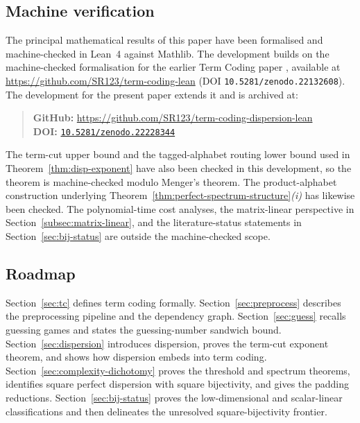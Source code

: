 \documentclass[11pt]{article}
\newcommand{\parencite}[1]{\citep{#1}}
\theoremstyle{definition}
\theoremstyle{plain}
\begin{document}
\subsection{Machine verification}
\label{subsec:verification}
The principal mathematical results of this paper have been formalised and machine-checked in Lean~4 against
Mathlib.  The development builds on the machine-checked formalisation for the earlier Term Coding paper
\parencite{riis2026termcoding}, available at
\url{https://github.com/SR123/term-coding-lean}
(DOI \texttt{10.5281/zenodo.22132608}).  The development for the present paper extends it and is archived at:
\begin{quote}
\noindent\textbf{GitHub:} \url{https://github.com/SR123/term-coding-dispersion-lean}\\
\textbf{DOI:} \href{https://doi.org/10.5281/zenodo.22228344}{\texttt{10.5281/zenodo.22228344}}
\end{quote}
The term-cut upper bound and the tagged-alphabet routing lower bound used in
Theorem~\ref{thm:disp-exponent} have also been checked in this development, so the theorem is machine-checked
modulo Menger's theorem.  The product-alphabet construction underlying
Theorem~\ref{thm:perfect-spectrum-structure}\textit{(i)} has likewise been checked.  The polynomial-time cost
analyses, the matrix-linear perspective in Section~\ref{subsec:matrix-linear}, and the literature-status statements in
Section~\ref{sec:bij-status} are outside the machine-checked scope.

\subsection{Roadmap}
Section~\ref{sec:tc} defines term coding formally.
Section~\ref{sec:preprocess} describes the preprocessing pipeline and the dependency graph.
Section~\ref{sec:guess} recalls guessing games and states the guessing-number sandwich bound.
Section~\ref{sec:dispersion} introduces dispersion, proves the term-cut exponent theorem, and shows how
dispersion embeds into term coding.
Section~\ref{sec:complexity-dichotomy} proves the threshold and spectrum theorems, identifies square perfect
dispersion with square bijectivity, and gives the padding reductions.
Section~\ref{sec:bij-status} proves the low-dimensional and scalar-linear classifications and then delineates
the unresolved square-bijectivity frontier.
\end{document}
